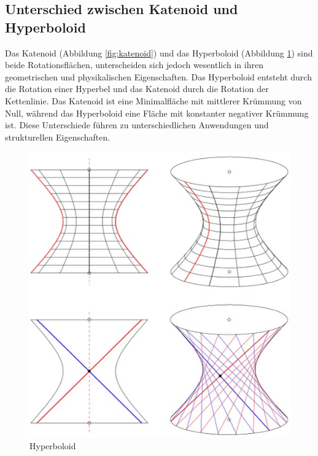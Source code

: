 \subsection{Unterschied zwischen Katenoid und Hyperboloid
	\label{Das Katenoid:subsection:Unterschied zwischen Katenoid und Hyperboloid}}
Das Katenoid (Abbildung \ref{fig:katenoid}) und das Hyperboloid (Abbildung \ref{fig:bild1}) sind beide Rotationsflächen, unterscheiden sich jedoch wesentlich in ihren geometrischen und physikalischen Eigenschaften.
Das Hyperboloid entsteht durch die Rotation einer Hyperbel und das Katenoid durch die Rotation der Kettenlinie. 
Das Katenoid ist eine Minimalfläche mit mittlerer Krümmung von Null, während das Hyperboloid eine Fläche mit konstanter negativer Krümmung ist.
Diese Unterschiede führen zu unterschiedlichen Anwendungen und strukturellen Eigenschaften.
\begin{figure}
	\centering
	\includegraphics[width=0.7\linewidth]{papers/minimalflaechen/Bild1}
	\caption{Hyperboloid}
	\label{fig:bild1}
\end{figure}

